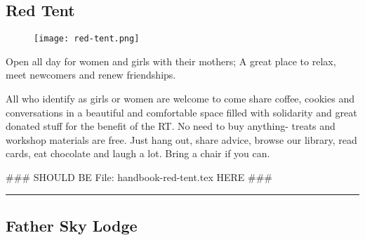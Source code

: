 \documentclass[9pt,twoside,openright,final,article,letterpaper]{memoir}
\renewcommand{\pfbreakdisplay}{%
  \needspace{24pt}%
  \vspace{8pt}\\\ding{76}\quad\ding{77}\quad\ding{78}\\%
  \vspace{11pt}}
\let\oldsubsection=\subsection
\renewcommand{\subsection}[1]{%
  \vspace{6pt}
  \needspace{1.25in}
  \oldsubsection{#1}
  \nopagebreak}
\begin{document}
\begin{multicols}{2}

  \subsection{Red Tent}

  \begingroup
  \setlength{\columnsep}{6pt}%
  \begin{wrapfigure}{l}{.5\columnwidth}
  \texttt{[image: red-tent.png]}
  \end{wrapfigure}

  Open all day for women and girls with their mothers; A great place
  to relax, meet newcomers and renew friendships.

  All who identify as girls or women are welcome to come share coffee,
  cookies and conversations in a beautiful and comfortable space
  filled with solidarity and great donated stuff for the benefit of
  the RT. No need to buy anything- treats and workshop materials are
  free. Just hang out, share advice, browse our library, read cards,
  eat chocolate and laugh a lot. Bring a chair if you can.

  \endgroup
  
 ### SHOULD BE File: handbook-red-tent.tex HERE ### 









  \fancybreak{\pfbreakdisplay}

  \subsection{Father Sky Lodge}


\end{multicols}
\end{document}
